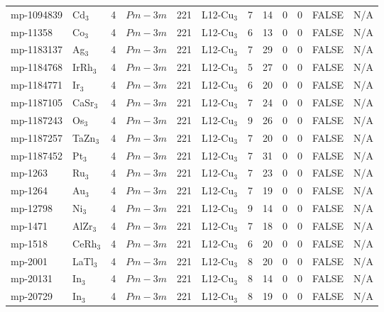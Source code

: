 {\begin{longtable}{llcccccccccc}
    mp-1094839 & Cd$_{3}$ & 4     & $Pm-3m$ & 221   & L12-Cu$_{3}$ & 7     & 14    & 0     & 0     & FALSE & N/A \\
    mp-11358 & Co$_{3}$ & 4     & $Pm-3m$ & 221   & L12-Cu$_{3}$ & 6     & 13    & 0     & 0     & FALSE & N/A \\
    mp-1183137 & Ag$_{3}$ & 4     & $Pm-3m$ & 221   & L12-Cu$_{3}$ & 7     & 29    & 0     & 0     & FALSE & N/A \\
    mp-1184768 & IrRh$_{3}$ & 4     & $Pm-3m$ & 221   & L12-Cu$_{3}$ & 5     & 27    & 0     & 0     & FALSE & N/A \\
    mp-1184771 & Ir$_{3}$ & 4     & $Pm-3m$ & 221   & L12-Cu$_{3}$ & 6     & 20    & 0     & 0     & FALSE & N/A \\
    mp-1187105 & CaSr$_{3}$ & 4     & $Pm-3m$ & 221   & L12-Cu$_{3}$ & 7     & 24    & 0     & 0     & FALSE & N/A \\
    mp-1187243 & Os$_{3}$ & 4     & $Pm-3m$ & 221   & L12-Cu$_{3}$ & 9     & 26    & 0     & 0     & FALSE & N/A \\
    mp-1187257 & TaZn$_{3}$ & 4     & $Pm-3m$ & 221   & L12-Cu$_{3}$ & 7     & 20    & 0     & 0     & FALSE & N/A \\
    mp-1187452 & Pt$_{3}$ & 4     & $Pm-3m$ & 221   & L12-Cu$_{3}$ & 7     & 31    & 0     & 0     & FALSE & N/A \\
    mp-1263 & Ru$_{3}$ & 4     & $Pm-3m$ & 221   & L12-Cu$_{3}$ & 7     & 23    & 0     & 0     & FALSE & N/A \\
    mp-1264 & Au$_{3}$ & 4     & $Pm-3m$ & 221   & L12-Cu$_{3}$ & 7     & 19    & 0     & 0     & FALSE & N/A \\
    mp-12798 & Ni$_{3}$ & 4     & $Pm-3m$ & 221   & L12-Cu$_{3}$ & 9     & 14    & 0     & 0     & FALSE & N/A \\
    mp-1471 & AlZr$_{3}$ & 4     & $Pm-3m$ & 221   & L12-Cu$_{3}$ & 7     & 18    & 0     & 0     & FALSE & N/A \\
    mp-1518 & CeRh$_{3}$ & 4     & $Pm-3m$ & 221   & L12-Cu$_{3}$ & 6     & 20    & 0     & 0     & FALSE & N/A \\
    mp-2001 & LaTl$_{3}$ & 4     & $Pm-3m$ & 221   & L12-Cu$_{3}$ & 8     & 20    & 0     & 0     & FALSE & N/A \\
    mp-20131 & In$_{3}$ & 4     & $Pm-3m$ & 221   & L12-Cu$_{3}$ & 8     & 14    & 0     & 0     & FALSE & N/A \\
    mp-20729 & In$_{3}$ & 4     & $Pm-3m$ & 221   & L12-Cu$_{3}$ & 8     & 19    & 0     & 0     & FALSE & N/A \\

\end{longtable}}
